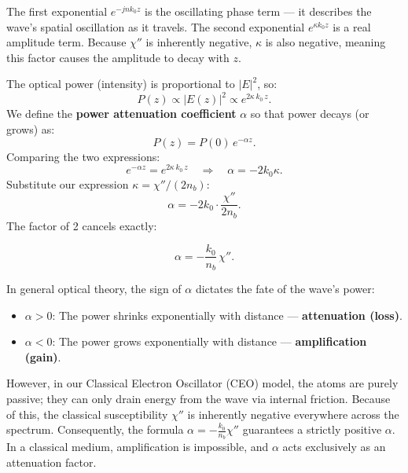 The first exponential $e^{-jnk_0z}$ is the oscillating phase term — it describes the wave's spatial oscillation as it travels. The second exponential $e^{\kappa k_0 z}$ is a real amplitude term. Because $\chi''$ is inherently negative, $\kappa$ is also negative, meaning this factor causes the amplitude to decay with $z$.

The optical power (intensity) is proportional to $|E|^2$, so:
\begin{equation*}
    P(z) \propto |E(z)|^2 \propto e^{2\kappa\,k_0\,z}.
\end{equation*}
We define the \textbf{power attenuation coefficient} $\alpha$ so that power decays (or grows) as:
\begin{equation*}
    P(z) = P(0)\,e^{-\alpha z}.
\end{equation*}
Comparing the two expressions:
\begin{equation*}
    e^{-\alpha z} = e^{2\kappa\,k_0\,z} \quad \Rightarrow \quad \alpha = -2k_0\kappa.
\end{equation*}
Substitute our expression $\kappa = \chi''/(2n_b)$:
\begin{equation*}
    \alpha = -2k_0 \cdot \frac{\chi''}{2n_b}.
\end{equation*}
The factor of 2 cancels exactly:
\begin{keyresult}
    \begin{equation}
        \alpha = -\frac{k_0}{n_b}\,\chi''.
    \end{equation}
\end{keyresult}

In general optical theory, the sign of $\alpha$ dictates the fate of the wave's power:
\begin{itemize}
    \item $\alpha > 0$: The power shrinks exponentially with distance — \textbf{attenuation (loss)}.
    \item $\alpha < 0$: The power grows exponentially with distance — \textbf{amplification (gain)}.
\end{itemize}

However, in our Classical Electron Oscillator (CEO) model, the atoms are purely passive; they can only drain energy from the wave via internal friction. Because of this, the classical susceptibility $\chi''$ is inherently negative everywhere across the spectrum. Consequently, the formula $\alpha = -\frac{k_0}{n_b}\chi''$ guarantees a strictly positive $\alpha$. In a classical medium, amplification is impossible, and $\alpha$ acts exclusively as an attenuation factor.

